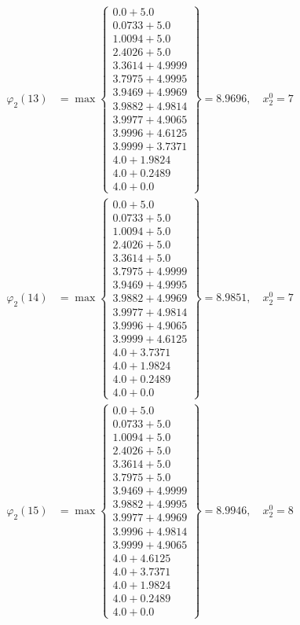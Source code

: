\documentclass{article}
\begin{document}
\begin{align*}
\varphi_{2}(13) &= \max \left\{ \begin{array}{c}
0.0 + 5.0 \\
 0.0733 + 5.0 \\
 1.0094 + 5.0 \\
 2.4026 + 5.0 \\
 3.3614 + 4.9999 \\
 3.7975 + 4.9995 \\
 3.9469 + 4.9969 \\
 3.9882 + 4.9814 \\
 3.9977 + 4.9065 \\
 3.9996 + 4.6125 \\
 3.9999 + 3.7371 \\
 4.0 + 1.9824 \\
 4.0 + 0.2489 \\
 4.0 + 0.0
\end{array} \right\}=8.9696, \quad x_{2}^0=7\\
  
\varphi_{2}(14) &= \max \left\{ \begin{array}{c}
0.0 + 5.0 \\
 0.0733 + 5.0 \\
 1.0094 + 5.0 \\
 2.4026 + 5.0 \\
 3.3614 + 5.0 \\
 3.7975 + 4.9999 \\
 3.9469 + 4.9995 \\
 3.9882 + 4.9969 \\
 3.9977 + 4.9814 \\
 3.9996 + 4.9065 \\
 3.9999 + 4.6125 \\
 4.0 + 3.7371 \\
 4.0 + 1.9824 \\
 4.0 + 0.2489 \\
 4.0 + 0.0
\end{array} \right\}=8.9851, \quad x_{2}^0=7\\
  
\varphi_{2}(15) &= \max \left\{ \begin{array}{c}
0.0 + 5.0 \\
 0.0733 + 5.0 \\
 1.0094 + 5.0 \\
 2.4026 + 5.0 \\
 3.3614 + 5.0 \\
 3.7975 + 5.0 \\
 3.9469 + 4.9999 \\
 3.9882 + 4.9995 \\
 3.9977 + 4.9969 \\
 3.9996 + 4.9814 \\
 3.9999 + 4.9065 \\
 4.0 + 4.6125 \\
 4.0 + 3.7371 \\
 4.0 + 1.9824 \\
 4.0 + 0.2489 \\
 4.0 + 0.0
\end{array} \right\}=8.9946, \quad x_{2}^0=8\\
  

\end{align*}
\end{document}
